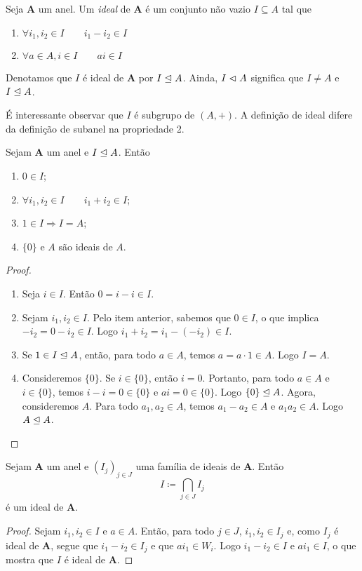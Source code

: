 \begin{defi}
	Seja $\bm A$ um anel. Um \emph{ideal} de $\bm A$ é um conjunto não vazio $I \subseteq A$ tal que
	\begin{enumerate}
	\item $\forall i_1,i_2 \in I \qquad i_1 - i_2 \in I$
	\item $\forall a \in A, i \in I \qquad ai \in I$
	\end{enumerate}
Denotamos que $I$ é ideal de $\bm A$ por $I \mathrel{\unlhd} A$. Ainda, $I \mathrel{\lhd} A$ significa que $I \neq A$ e $I \mathrel{\unlhd} A$.
\end{defi}

	É interessante observar que $I$ é subgrupo de $(A,+)$. A definição de ideal difere da definição de subanel na propriedade 2.

\begin{prop}
	Sejam $\bm A$ um anel e $I \mathrel{\unlhd} A$. Então
	\begin{enumerate}
	\item $0 \in I$;
	\item $\forall i_1,i_2 \in I \qquad i_1 + i_2 \in I$;
	\item $1 \in I \Rightarrow I=A$;
	\item $\{0\}$ e $A$ são ideais de $A$.
	\end{enumerate}
\end{prop}
\begin{proof}
	\begin{enumerate}
	\item Seja $i \in I$. Então $0 = i-i \in I$.
	\item Sejam $i_1,i_2 \in I$. Pelo item anterior, sabemos que $0 \in I$, o que implica $-i_2 = 0 - i_2 \in I$. Logo $i_1 + i_2 = i_1 - (-i_2) \in I$.
	\item Se $1 \in I \mathrel{\unlhd} A$, então, para todo $a \in A$, temos $a=a\cdot1 \in A$. Logo $I=A$.
	\item Consideremos $\{0\}$. Se $i \in \{0\}$, então $i=0$. Portanto, para todo $a \in A$ e $i \in \{0\}$, temos $i-i=0 \in \{0\}$ e $ai=0 \in \{0\}$. Logo $\{0\} \mathrel{\unlhd} A$. Agora, consideremos $A$. Para todo $a_1,a_2 \in A$, temos $a_1-a_2 \in A$ e $a_1a_2 \in A$. Logo $A \mathrel{\unlhd} A$.
	\end{enumerate}
\end{proof}

\begin{prop}
	Sejam $\bm A$ um anel e $(I_j)_{j \in J}$ uma família de ideais de $\bm A$. Então
	\begin{equation*}
	I \coloneqq \bigcap_{j \in J} I_j
	\end{equation*}
é um ideal de $\bm A$.
\end{prop}
\begin{proof}
	Sejam $i_1,i_2 \in I$ e $a \in A$. Então, para todo $j \in J$, $i_1,i_2 \in I_j$ e, como $I_j$ é ideal de $\bm A$, segue que $i_1-i_2 \in I_j$ e que $ai_1 \in W_i$. Logo $i_1-i_2 \in I$ e $ai_1 \in I$, o que mostra que $I$ é ideal de $\bm A$.
\end{proof}

